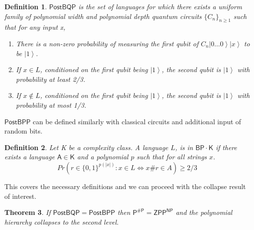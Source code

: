 \documentclass[10pt,a4paper]{article}
\newcommand{\ket}[1]{\left|#1\right\rangle}
\newtheorem{theorem}{Theorem}
\newtheorem{definition}[theorem]{Definition}
\begin{document}
\begin{definition}
$\mathsf{PostBQP}$ is the set of languages for which there exists a uniform family of polynomial width and polynomial depth quantum circuits $\{C_n\}_ {n\geq 1}$ such that for any input x,
\begin{enumerate}[label=(\roman*)]
    \item There is a non-zero probability of measuring the first qubit of $C_n \ket{0\ldots 0}\ket{x}$ to be $\ket{1}$.
    \item If $x\in L$, conditioned on the first qubit being $\ket{1}$, the second qubit is $\ket{1}$ with probability at least 2/3.
    \item If $x\notin L$, conditioned on the first qubit being $\ket{1}$, the second qubit is $\ket{1}$ with probability at most 1/3.
\end{enumerate}
\end{definition}

$\mathsf{PostBPP}$ can be defined similarly with classical circuits and additional input of random bits.

\begin{definition}
    Let K be a complexity class. A language $L$, is in $\mathsf{BP\cdot K}$ if there exists a language $\mathsf{A \in K}$ and a polynomial $p$ such that for all strings $x$.
$$Pr(r \in \{0,1\}^{p(|x|)}: x \in L \iff x\#r \in A) \geq 2/3$$
\end{definition}

This covers the necessary definitions and we can proceed with the collapse result of interest.

\begin{theorem}\label{thm: postbqp postbpp}
    If $\mathsf{PostBQP=PostBPP}$ then $\mathsf{P^{\#P}=ZPP^{NP}}$ and the polynomial hierarchy collapses to the second level.
\end{theorem}
\end{document}
